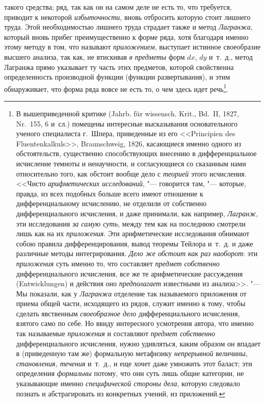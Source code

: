 такого средства; ряд, так как он на самом деле не есть то, что требуется,
приводит к некоторой {\em избыточности}, вновь отбросить которую стоит лишнего
труда. Этой необходимостью лишнего труда страдает также и метод {\em Лагранжа},
который вновь прибег преимущественно к форме ряда, хотя благодаря именно этому
методу в том, что называют {\em приложением}, выступает истинное своеобразие
высшего анализа, так как, не втискивая {\em в предметы} форм $dx$, $dy$
и~т.~д., метод Лагранжа прямо указывает ту часть этих предметов, которой
свойственна определенность производной функции (функции развертывания), и этим
обнаруживает, что форма ряда вовсе не есть то, о чем здесь идет речь\footnote{В
вышеприведенной критике (Jahrb. für wissensch. Krit., Bd.~II, 1827, Nr.~155, 6
и~сл.) помещены интересные высказывания основательного ученого специалиста
г.~Шпера, приведенные из его <<Prin\-ci\-pien des Flu\-enten\-kal\-kuls>>,
Braun\-schweig, 1826, касающиеся именно одного из обстоятельств, существенно
способствующих внесению в дифференциальное исчисление темноты и ненаучности, и
согласующиеся со сказанным нами относительно того, как обстоит вообще дело с
{\em теорией} этого исчисления. <<Чисто {\em арифметических исследований}, "---
говорится там, "--- которые, правда, из всех подобных больше всего имеют
отношение к дифференциальному исчислению, не отделили от собственно
дифференциального исчисления, и даже принимали, как например, {\em Лагранж},
эти исследования {\em за самую суть}, между тем как на последнюю смотрели лишь
как на их {\em приложения}. Эти арифметические исследования обнимают собою
правила дифференцирования, вывод теоремы Тейлора и~т.~д. и даже различные
методы интегрирования. {\em Дело же обстоит как раз наоборот}: эти
{\em приложения} суть именно то, что составляет {\em предмет собственно}
дифференциального исчисления, все же те арифметические рассуждения
(Ent\-wick\-lungen) и действия оно {\em предполагает} известными из анализа>>.
"--- Мы показали, как у {\em Лагранжа} отделение так называемого приложения от
приема общей части, исходящего из рядов, служит именно к тому, чтобы сделать
явственным {\em своеобразное дело} дифференциального исчисления, взятого само
по себе. Но ввиду интересного усмотрения автора, что именно так называемые
{\em приложения} и составляют {\em предмет собственно} дифференциального
исчисления, нужно удивляться, каким образом он впадает в (приведенную там же)
формальную метафизику {\em непрерывной} величины, {\em становления, течения}
и~т.~д., и еще хочет даже умножить этот баласт; эти определения {\em формальны}
потому, что они суть лишь общие категории, не указывающие именно
{\em специфической стороны дела}, которую следовало познать и абстрагировать
из конкретных учений, из приложений.}.


